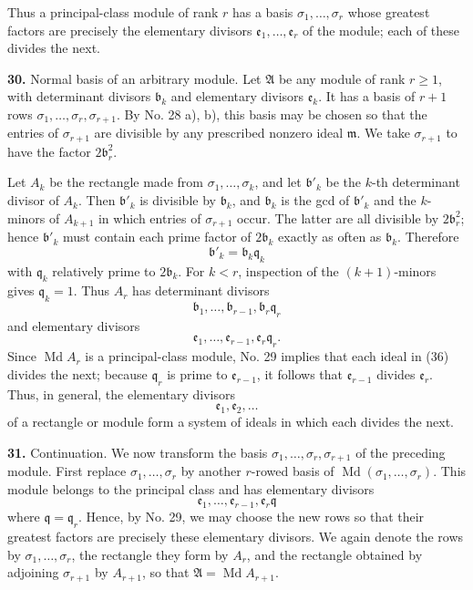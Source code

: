 \documentclass[11pt,a4paper]{article}
\begin{document}
Thus a principal-class module of rank \(r\) has a basis \(\sigma_1,\ldots,\sigma_r\) whose greatest factors are precisely the elementary divisors \(\mathfrak e_1,\ldots,\mathfrak e_r\) of the module; each of these divides the next.

\textbf{30.} Normal basis of an arbitrary module. Let \(\mathfrak A\) be any module of rank \(r\ge1\), with determinant divisors \(\mathfrak b_k\) and elementary divisors \(\mathfrak e_k\). It has a basis of \(r+1\) rows \(\sigma_1,\ldots,\sigma_r,\sigma_{r+1}\). By No. 28 a), b), this basis may be chosen so that the entries of \(\sigma_{r+1}\) are divisible by any prescribed nonzero ideal \(\mathfrak m\). We take \(\sigma_{r+1}\) to have the factor \(2\mathfrak b_r^2\).

Let \(A_k\) be the rectangle made from \(\sigma_1,\ldots,\sigma_k\), and let \(\mathfrak b'_k\) be the \(k\)-th determinant divisor of \(A_k\). Then \(\mathfrak b'_k\) is divisible by \(\mathfrak b_k\), and \(\mathfrak b_k\) is the gcd of \(\mathfrak b'_k\) and the \(k\)-minors of \(A_{k+1}\) in which entries of \(\sigma_{r+1}\) occur. The latter are all divisible by \(2\mathfrak b_r^2\); hence \(\mathfrak b'_k\) must contain each prime factor of \(2\mathfrak b_k\) exactly as often as \(\mathfrak b_k\). Therefore
\[
 \mathfrak b'_k=\mathfrak b_k\mathfrak q_k
\]
with \(\mathfrak q_k\) relatively prime to \(2\mathfrak b_k\). For \(k<r\), inspection of the \((k+1)\)-minors gives \(\mathfrak q_k=1\). Thus \(A_r\) has determinant divisors
\[
 \mathfrak b_1,\ldots,\mathfrak b_{r-1},\mathfrak b_r\mathfrak q_r
\]
and elementary divisors
\[
 \mathfrak e_1,\ldots,\mathfrak e_{r-1},\mathfrak e_r\mathfrak q_r. \tag{36}
\]
Since \(\operatorname{Md}A_r\) is a principal-class module, No. 29 implies that each ideal in (36) divides the next; because \(\mathfrak q_r\) is prime to \(\mathfrak e_{r-1}\), it follows that \(\mathfrak e_{r-1}\) divides \(\mathfrak e_r\). Thus, in general, the elementary divisors
\[
 \mathfrak e_1,\mathfrak e_2,\ldots
\]
of a rectangle or module form a system of ideals in which each divides the next.

\textbf{31.} Continuation. We now transform the basis \(\sigma_1,\ldots,\sigma_r,\sigma_{r+1}\) of the preceding module. First replace \(\sigma_1,\ldots,\sigma_r\) by another \(r\)-rowed basis of \(\operatorname{Md}(\sigma_1,\ldots,\sigma_r)\). This module belongs to the principal class and has elementary divisors
\[
 \mathfrak e_1,\ldots,\mathfrak e_{r-1},\mathfrak e_r\mathfrak q
\]
where \(\mathfrak q=\mathfrak q_r\). Hence, by No. 29, we may choose the new rows so that their greatest factors are precisely these elementary divisors. We again denote the rows by \(\sigma_1,\ldots,\sigma_r\), the rectangle they form by \(A_r\), and the rectangle obtained by adjoining \(\sigma_{r+1}\) by \(A_{r+1}\), so that \(\mathfrak A=\operatorname{Md}A_{r+1}\).
\end{document}
